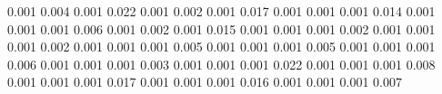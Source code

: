 0.001      0.004      %
0.001      0.022      %
0.001      0.002      %
0.001      0.017      %
0.001      0.001      %
0.001      0.014      %
0.001      0.001      %
0.001      0.006      %
0.001      0.002      %
0.001      0.015      %
0.001      0.001      %
0.001      0.002      %
0.001      0.001      %
0.001      0.002      %
0.001      0.001      %
0.001      0.005      %
0.001      0.001      %
0.001      0.005      %
0.001      0.001      %
0.001      0.006      %
0.001      0.001      %
0.001      0.003      %
0.001      0.001      %
0.001      0.022      %
0.001      0.001      %
0.001      0.008      %
0.001      0.001      %
0.001      0.017      %
0.001      0.001      %
0.001      0.016      %
0.001      0.001      %
0.001      0.007      %
